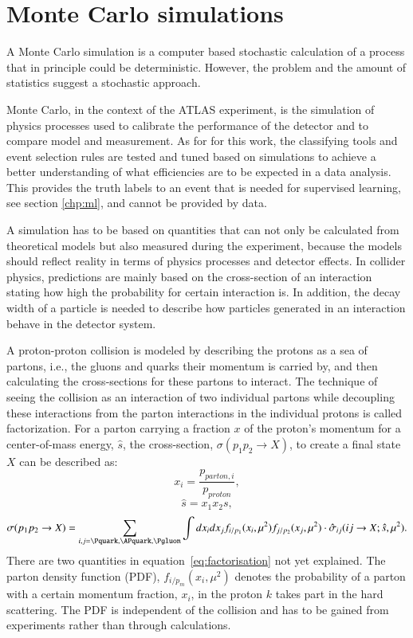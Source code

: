 \section{Monte Carlo simulations}

A Monte Carlo simulation is a computer based stochastic calculation of a process that in principle could be deterministic. However, the problem and the amount of statistics suggest a stochastic approach.

Monte Carlo, in the context of the ATLAS experiment, is the simulation of physics processes used to calibrate the performance of the detector and to compare model and measurement. As for for this work, the classifying tools and event selection rules are tested and tuned based on simulations to achieve a better understanding of what efficiencies are to be expected in a data analysis. This provides the truth labels to an event that is needed for supervised learning, see section \ref{chp:ml}, and cannot be provided by data.

A simulation has to be based on quantities that can not only be calculated from theoretical models but also measured during the experiment, because the models should reflect reality in terms of physics processes and detector effects. In collider physics, predictions are mainly based on  the cross-section of an interaction stating how high the probability for certain interaction is. In addition, the decay width of a particle is needed to describe how particles generated in an interaction behave in the detector system.

A proton-proton collision is modeled by describing the protons as a sea of partons, {i.e.}, the gluons and quarks their momentum is carried by, and then calculating the cross-sections for these partons to interact. The technique of seeing the collision as an interaction of two individual partons while decoupling these interactions from the parton interactions in the individual protons is called factorization.
For a parton carrying a fraction $x$ of the proton's momentum for a center-of-mass energy, $\hat{s}$, the cross-section, $\sigma(p_1 p_2 \rightarrow X)$, to create a final state $X$ can be described as:
%
\begin{equation}
	x_i = \frac{p_{parton,i}}{p_{proton}}, 
\end{equation}
%
%
\begin{equation}
	\hat{s} = x_1 x_2 s,
\end{equation}
%
%
\begin{align}
	\sigma ( p_1 p_2 \rightarrow X ) = \sum_{i,j = \Pquark, \APquark, \Pgluon} \int dx_i dx_j f_{i/p_1} ( x_i, \mu^2 ) f_{j/p_2} ( x_j, \mu^2 ) \cdot \hat{\sigma}_{ij} ( ij \rightarrow X; \hat{s}, \mu^2 ).
	\label{eq:factorisation}
\end{align}
%
There are two quantities in equation~\ref{eq:factorisation} not yet explained.
The parton density function (PDF), $f_{i/p_m} ( x_i, \mu^2 )$ denotes the probability of a parton with a certain momentum fraction, $x_i$, in the proton $k$ takes part in the hard scattering.
The PDF is independent of the collision and has to be gained from experiments rather than through calculations.


